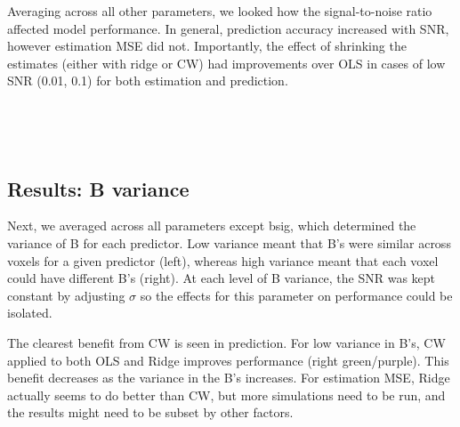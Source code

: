 \documentclass{article}
\begin{document}
Averaging across all other parameters, we looked how the signal-to-noise
ratio affected model performance. In general, prediction accuracy
increased with SNR, however estimation MSE did not. Importantly, the
effect of shrinking the estimates (either with ridge or CW) had
improvements over OLS in cases of low SNR (0.01, 0.1) for both
estimation and prediction.


    \begin{center}
    \end{center}
    { \hspace*{\fill} \\}
    

    \begin{center}
    \end{center}
    { \hspace*{\fill} \\}
    
    \subsection{Results: B variance}\label{results-b-variance}

Next, we averaged across all parameters except bsig, which determined
the variance of B for each predictor. Low variance meant that B's were
similar across voxels for a given predictor (left), whereas high
variance meant that each voxel could have different B's (right). At each
level of B variance, the SNR was kept constant by adjusting $ \sigma $
so the effects for this parameter on performance could be isolated.

The clearest benefit from CW is seen in prediction. For low variance in
B's, CW applied to both OLS and Ridge improves performance (right
green/purple). This benefit decreases as the variance in the B's
increases. For estimation MSE, Ridge actually seems to do better than
CW, but more simulations need to be run, and the results might need to
be subset by other factors.


    \begin{center}
    \end{center}
    { \hspace*{\fill} \\}
    
\end{document}
